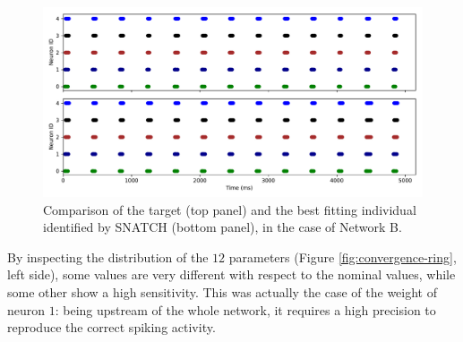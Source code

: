 \documentclass[utf8]{frontiersFPHY} %
\newcommand {\name}{SNATCH}
\begin{document}
\begin{figure}[!ht]
	\centering
	\includegraphics[width=\textwidth]{images/ring-network-regular/target_sim.pdf}
	\caption{Comparison of the target (top panel) and the best fitting individual identified by \name{} (bottom panel), in the case of Network B.}
	\label{fig:target-ring}
\end{figure}

By inspecting the distribution of the $12$ parameters (Figure \ref{fig:convergence-ring}, left side), some values are very different with respect to the nominal values, while some other show a high sensitivity. 
This was actually the case of the weight of neuron $1$: being upstream of the whole network, it requires a high precision to reproduce the correct spiking  activity.


\end{document}
